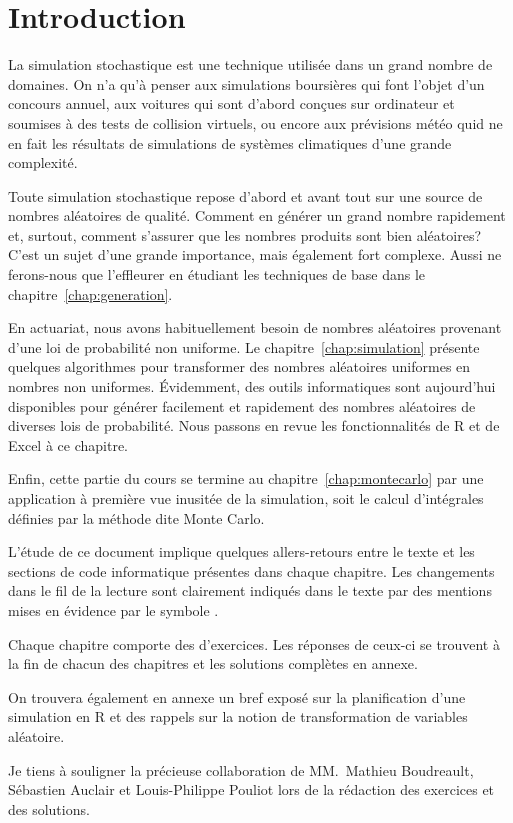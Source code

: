 \chapter*{Introduction}

La simulation stochastique est une technique utilisée dans un grand
nombre de domaines. On n’a qu’à penser aux simulations boursières qui
font l’objet d’un concours annuel, aux voitures qui sont d’abord
conçues sur ordinateur et soumises à des tests de collision virtuels,
ou encore aux prévisions météo quid ne en fait les résultats de
simulations de systèmes climatiques d'une grande complexité.

Toute simulation stochastique repose d’abord et avant tout sur une
source de nombres aléatoires de qualité. Comment en générer un grand
nombre rapidement et, surtout, comment s’assurer que les nombres
produits sont bien aléatoires? C’est un sujet d’une grande importance,
mais également fort complexe. Aussi ne ferons-nous que l'effleurer en
étudiant les techniques de base dans le
chapitre~\ref{chap:generation}.

En actuariat, nous avons habituellement besoin de nombres aléatoires
provenant d’une loi de probabilité non uniforme. Le
chapitre~\ref{chap:simulation} présente quelques algorithmes pour
transformer des nombres aléatoires uniformes en nombres non uniformes.
Évidemment, des outils informatiques sont aujourd'hui disponibles pour
générer facilement et rapidement des nombres aléatoires de diverses
lois de probabilité. Nous passons en revue les fonctionnalités de R et
de Excel à ce chapitre.

Enfin, cette partie du cours se termine au
chapitre~\ref{chap:montecarlo} par une application à première vue
inusitée de la simulation, soit le calcul d’intégrales définies par la
méthode dite Monte Carlo.

L'étude de ce document implique quelques allers-retours entre le texte
et les sections de code informatique présentes dans chaque chapitre.
Les changements dans le fil de la lecture sont clairement indiqués
dans le texte par des mentions mises en évidence par le symbole
{\color{darkred}\noway}.

Chaque chapitre comporte des d'exercices. Les réponses de ceux-ci se
trouvent à la fin de chacun des chapitres et les solutions complètes
en annexe.

On trouvera également en annexe un bref exposé sur la planification
d'une simulation en R et des rappels sur la notion de transformation
de variables aléatoire.

Je tiens à souligner la précieuse collaboration de MM.~Mathieu
Boudreault, Sébastien Auclair et Louis-Philippe Pouliot lors de la
rédaction des exercices et des solutions.

